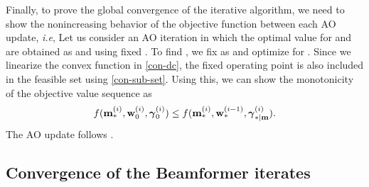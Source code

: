 Finally, to prove the global convergence of the iterative algorithm, we need to show the nonincreasing behavior of the objective function between each \ac{AO} update, \textit{i.e}, 
\iftoggle{single_column}{
\begin{equation}\allowdisplaybreaks
f(\iter{\mx}{\ast}{i},\iter{\my}{\ast}{i},\iter{\mz}{\ast|\mx}{i}) \leq f(\iter{\mx}{\ast}{i},\iter{\my}{0}{i},\iter{\mz}{0}{i}) \leq f(\iter{\mx}{\ast}{i},\iter{\my}{\ast}{i-1},\iter{\mz}{\ast|\my}{i}).
\end{equation}}{
\begin{multline}\allowdisplaybreaks
f(\iter{\mx}{\ast}{i},\iter{\my}{\ast}{i},\iter{\mz}{\ast|\mx}{i}) \leq f(\iter{\mx}{\ast}{i},\iter{\my}{0}{i},\iter{\mz}{0}{i}) \\
\leq f(\iter{\mx}{\ast}{i},\iter{\my}{\ast}{i-1},\iter{\mz}{\ast|\my}{i}).
\end{multline}}
Let us consider an \ac{AO} iteration  in which the optimal value for \eqn{\mx} and \eqn{\mz} are obtained as  and  using fixed . To find , we fix \eqn{\mx} as  and optimize for \me{\my}. Since we linearize the convex function in \eqref{con-dc}, the fixed operating point is also included in the feasible set  using \eqref{con-sub-set}. Using this, we can show the monotonicity of the objective value sequence as
\begin{equation}
f({\mathbf{m}}_{\ast}^{(i)},{\mathbf{w}}_{0}^{(i)},{{\boldsymbol{\gamma}}}_{0}^{(i)}) \leq f({\mathbf{m}}_{\ast}^{(i)},{\mathbf{w}}_{\ast}^{(i-1)},{{\boldsymbol{\gamma}}}_{\ast|\mathbf{m}}^{(i)}).
\end{equation}
The \ac{AO} update follows . %

\subsection{Convergence of the Beamformer iterates}

